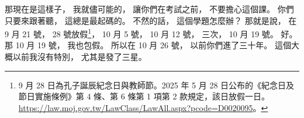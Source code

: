 \hypertarget{w01:cue:629}{}那現在是這樣子，
\hypertarget{w01:cue:630}{}我就儘可能的，
\hypertarget{w01:cue:631}{}讓你們在考試之前，
\hypertarget{w01:cue:632}{}不要擔心這個課。
\hypertarget{w01:cue:633}{}你們只要來跟著聽，
\hypertarget{w01:cue:634}{}這總是最起碼的。
\hypertarget{w01:cue:635}{}不然的話，
\hypertarget{w01:cue:636}{}這個學題怎麼辦？
\hypertarget{w01:cue:637}{}那就是說，
\hypertarget{w01:cue:638}{}在 9 月 21 號，
\hypertarget{w01:cue:639}{}28 號放假\footnote{9 月 28 日為孔子誕辰紀念日與教師節。2025 年 5 月 28 日公布的《紀念日及節日實施條例》第 4 條、第 6 條第 1 項第 2 款規定，該日放假一日。\url{https://law.moj.gov.tw/LawClass/LawAll.aspx?pcode=D0020095}。}，
\hypertarget{w01:cue:640}{}10 月 5 號，
\hypertarget{w01:cue:641}{}10 月 12 號，
\hypertarget{w01:cue:642}{}三次，
\hypertarget{w01:cue:643}{}10 月 19 號。
\hypertarget{w01:cue:644}{}好。
\hypertarget{w01:cue:645}{}那 10 月 19 號，
\hypertarget{w01:cue:646}{}我也包假。
\hypertarget{w01:cue:647}{}所以在 10 月 26 號，
\hypertarget{w01:cue:648}{}以前你們進了三十年。
\hypertarget{w01:cue:649}{}這個大概以前我沒有特別，
\hypertarget{w01:cue:650}{}尤其是發了三星。

